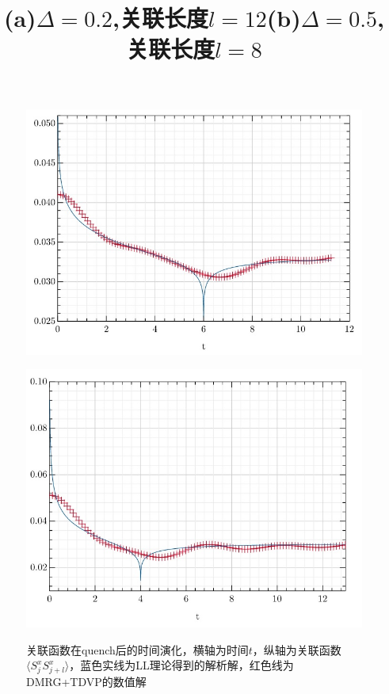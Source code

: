 \documentclass[12pt]{article}
\begin{document}
\begin{figure}[H]
        \begin{minipage}{0.49\linewidth}
        	\centering
        	\includegraphics[width=0.9\linewidth]{XXZcor0.2l12}
        	\title{(a)$\Delta=0.2$,关联长度$l=12$}
        	\label{fig:27}
        \end{minipage}
        \begin{minipage}{0.49\linewidth}
        	\centering
        	\includegraphics[width=0.9\linewidth]{XXZcor0.5}
        	\title{(b)$\Delta=0.5$,关联长度$l=8$}
        	\label{fig:28}
        \end{minipage}
      
      	\caption[9pt]{关联函数在quench后的时间演化，横轴为时间$t$，纵轴为关联函数$\langle S^x_{j}S^x_{j+l}\rangle$，蓝色实线为LL理论得到的解析解，红色线为DMRG+TDVP的数值解}
      \end{figure}
      
\end{document}
